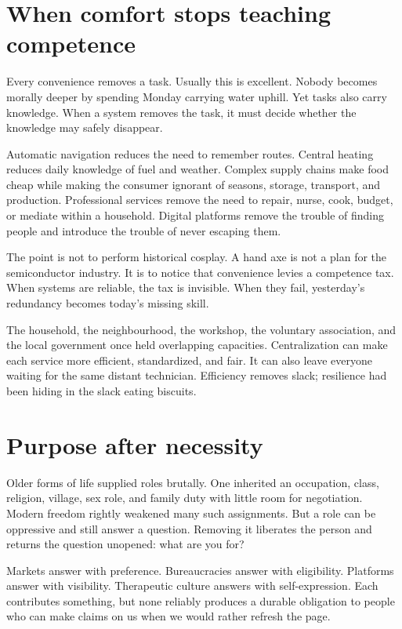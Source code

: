 \documentclass[12pt,a4paper]{book}
\begin{document}
\section{When comfort stops teaching competence}

Every convenience removes a task.  Usually this is excellent.  Nobody becomes
morally deeper by spending Monday carrying water uphill.  Yet tasks also carry
knowledge.  When a system removes the task, it must decide whether the
knowledge may safely disappear.

Automatic navigation reduces the need to remember routes.  Central heating
reduces daily knowledge of fuel and weather.  Complex supply chains make food
cheap while making the consumer ignorant of seasons, storage, transport, and
production.  Professional services remove the need to repair, nurse, cook,
budget, or mediate within a household.  Digital platforms remove the trouble
of finding people and introduce the trouble of never escaping them.

The point is not to perform historical cosplay.  A hand axe is not a plan for
the semiconductor industry.  It is to notice that convenience levies a
competence tax.  When systems are reliable, the tax is invisible.  When they
fail, yesterday's redundancy becomes today's missing skill.

The household, the neighbourhood, the workshop, the voluntary association,
and the local government once held overlapping capacities.  Centralization
can make each service more efficient, standardized, and fair.  It can also
leave everyone waiting for the same distant technician.  Efficiency removes
slack; resilience had been hiding in the slack eating biscuits.

\section{Purpose after necessity}

Older forms of life supplied roles brutally.  One inherited an occupation,
class, religion, village, sex role, and family duty with little room for
negotiation.  Modern freedom rightly weakened many such assignments.  But a
role can be oppressive and still answer a question.  Removing it liberates the
person and returns the question unopened: what are you for?

Markets answer with preference.  Bureaucracies answer with eligibility.
Platforms answer with visibility.  Therapeutic culture answers with
self-expression.  Each contributes something, but none reliably produces a
durable obligation to people who can make claims on us when we would rather
refresh the page.
\end{document}
